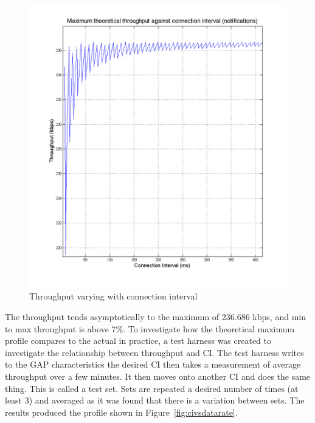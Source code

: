 \documentclass[]{article}
\begin{document}
\begin{figure}[H]
	\begin{center}
		\includegraphics[width = \textwidth]{throughput}
	\end{center}
	\caption{Throughput varying with connection interval}
	\label{fig:throughput}
\end{figure}

The throughput tends asymptotically to the maximum of 236.686 kbps, and min to max throughput is above 7$\%$. To investigate how the theoretical maximum profile compares to the actual in practice, a test harness was created to investigate the relationship between throughput and \ac{CI}. The test harness writes to the \ac{GAP} characteristics the desired \ac{CI} then takes a measurement of average throughput over a few minutes. It then moves onto another \ac{CI} and does the same thing. This is called a test set. Sets are repeated a desired number of times (at least 3) and averaged as it was found that there is a variation between sets. The results produced the profile shown in Figure~\ref{fig:civsdatarate}.
\end{document}
